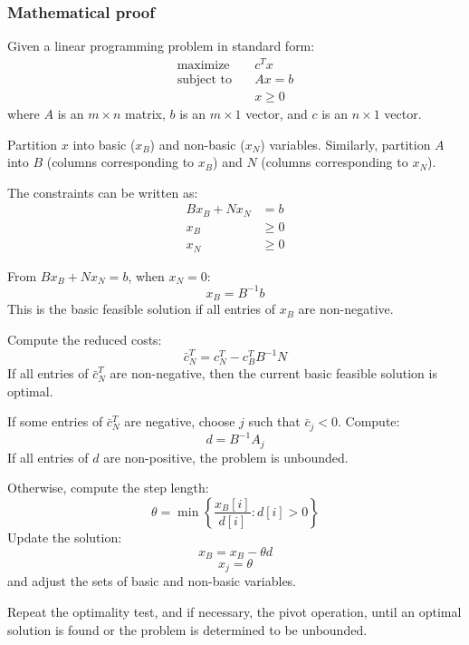 \subsubsection*{Mathematical proof}
Given a linear programming problem in standard form:
\begin{align*}
\text{maximize} \quad & c^T x \\
\text{subject to} \quad & Ax = b \\
& x \geq 0
\end{align*}
where \( A \) is an \( m \times n \) matrix, 
\( b \) is an \( m \times 1 \) vector, and 
\( c \) is an \( n \times 1 \) vector.


Partition \( x \) into basic (\( x_B \)) and non-basic (\( x_N \)) variables. 
Similarly, partition \( A \) into \( B \) (columns corresponding to \( x_B \)) 
and \( N \) (columns corresponding to \( x_N \)).

The constraints can be written as:
\begin{align*}
Bx_B + Nx_N &= b \\
x_B &\geq 0 \\
x_N &\geq 0
\end{align*}

From \( Bx_B + Nx_N = b \), when \( x_N = 0 \):
\[ x_B = B^{-1}b \]
This is the basic feasible solution if all entries of \( x_B \) are non-negative.

Compute the reduced costs:
\[ \bar{c}_N^T = c_N^T - c_B^T B^{-1} N \]
If all entries of \( \bar{c}_N^T \) are non-negative, 
then the current basic feasible solution is optimal.

If some entries of \( \bar{c}_N^T \) are negative, 
choose \( j \) such that \( \bar{c}_j < 0 \). Compute:
\[ d = B^{-1} A_j \]
If all entries of \( d \) are non-positive, the problem is unbounded.

Otherwise, compute the step length:
\[ \theta = \min \left\{ \frac{x_B[i]}{d[i]} : d[i] > 0 \right\} \]
Update the solution:
\[ x_B = x_B - \theta d \]
\[ x_j = \theta \]
and adjust the sets of basic and non-basic variables.

Repeat the optimality test, and if necessary, the pivot operation, 
until an optimal solution is found or the problem is determined to be unbounded. 

